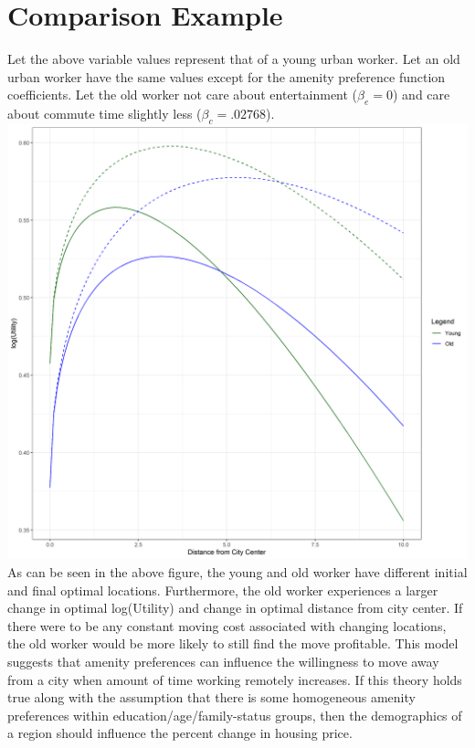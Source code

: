 \documentclass{article}
\begin{document}
\section{Comparison Example}
Let the above variable values represent that of a young urban worker. Let an old urban worker have the same values except for the amenity preference function coefficients. Let the old worker not care about entertainment ($\beta_e = 0$) and care about commute time slightly less ($\beta_c = .02768$).\\
\includegraphics[scale=.5]{images/remote_compare.png}
As can be seen in the above figure, the young and old worker have different initial and final optimal locations. Furthermore, the old worker experiences a larger change in optimal log(Utility) and change in optimal distance from city center. If there were to be any constant moving cost associated with changing locations, the old worker would be more likely to still find the move profitable. This model suggests that amenity preferences can influence the willingness to move away from a city when amount of time working remotely increases. If this theory holds true along with the assumption that there is some homogeneous amenity preferences within education/age/family-status groups, then the demographics of a region should influence the percent change in housing price.
\end{document}
